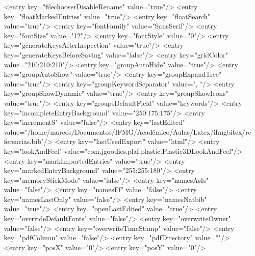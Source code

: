 \begin{codigo}[caption={Código de configuração do programa JabRef em XML}, label={codigo:config-jabref}, language=XML, breaklines=true]
            <entry key="filechooserDisableRename" value="true"/>
            <entry key="floatMarkedEntries" value="true"/>
            <entry key="floatSearch" value="true"/>
            <entry key="fontFamily" value="SansSerif"/>
            <entry key="fontSize" value="12"/>
            <entry key="fontStyle" value="0"/>
            <entry key="generateKeysAfterInspection" value="true"/>
            <entry key="generateKeysBeforeSaving" value="false"/>
            <entry key="gridColor" value="210:210:210"/>
            <entry key="groupAutoHide" value="true"/>
            <entry key="groupAutoShow" value="true"/>
            <entry key="groupExpandTree" value="true"/>
            <entry key="groupKeywordSeparator" value=", "/>
            <entry key="groupShowDynamic" value="true"/>
            <entry key="groupShowIcons" value="true"/>
            <entry key="groupsDefaultField" value="keywords"/>
            <entry key="incompleteEntryBackground" value="250:175:175"/>
            <entry key="incrementS" value="false"/>
            <entry key="lastEdited" value="/home/marcos/Documentos/IFMG/Acadêmico/Aulas/Latex/ifmgbitex/referencias.bib"/>
            <entry key="lastUsedExport" value="html"/>
            <entry key="lookAndFeel" value="com.jgoodies.plaf.plastic.Plastic3DLookAndFeel"/>
            <entry key="markImportedEntries" value="true"/>
            <entry key="markedEntryBackground" value="255:255:180"/>
            <entry key="memoryStickMode" value="false"/>
            <entry key="namesAsIs" value="false"/>
            <entry key="namesFf" value="false"/>
            <entry key="namesLastOnly" value="false"/>
            <entry key="namesNatbib" value="true"/>
            <entry key="openLastEdited" value="true"/>
            <entry key="overrideDefaultFonts" value="false"/>
            <entry key="overwriteOwner" value="false"/>
            <entry key="overwriteTimeStamp" value="false"/>
            <entry key="pdfColumn" value="false"/>
            <entry key="pdfDirectory" value=""/>
            <entry key="posX" value="0"/>
            <entry key="posY" value="0"/>

\end{codigo}
